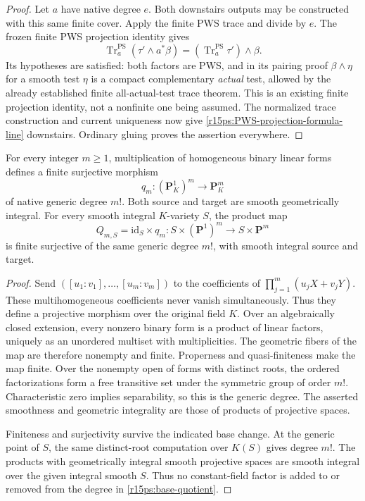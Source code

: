 \begin{proof}
Let $a$ have native degree $e$.  Both downstairs outputs may
be constructed with this same finite cover.  Apply the finite
PWS trace and divide by $e$.  The frozen finite PWS projection
identity gives
\[
 \operatorname{Tr}^{\mathrm{PS}}_a(\tau'\wedge a^*\beta)
                       =(\operatorname{Tr}^{\mathrm{PS}}_a\tau')
                                                    \wedge\beta.
\]
Its hypotheses are satisfied: both factors are PWS, and in
its pairing proof $\beta\wedge\eta$ for a smooth test $\eta$
is a compact complementary \emph{actual} test, allowed by the
already established finite all-actual-test trace theorem.
This is an existing finite projection identity, not a
nonfinite one being assumed.  The normalized trace construction
and current uniqueness now give
\eqref{r15ps:PWS-projection-formula-line} downstairs.  Ordinary
gluing proves the assertion everywhere.
\end{proof}

\begin{lemma}
\label{r15ps:symmetric-quotient}
For every integer $m\geq1$, multiplication of homogeneous binary
linear forms defines a finite surjective morphism
\[
 q_m:(\mathbf P^1_K)^m\longrightarrow\mathbf P^m_K
\tag{PS15.1}\label{r15ps:quotient}
\]
of native generic degree $m!$.  Both source and target are smooth
geometrically integral.  For every smooth integral $K$-variety
$S$, the product map
\[
 Q_{m,S}=\mathrm{id}_S\times q_m:
 S\times(\mathbf P^1)^m\longrightarrow S\times\mathbf P^m
\tag{PS15.2}\label{r15ps:base-quotient}
\]
is finite surjective of the same generic degree $m!$, with
smooth integral source and target.
\end{lemma}

\begin{proof}
Send $([u_1:v_1],\ldots,[u_m:v_m])$ to the coefficients of
$\prod_{j=1}^m(u_jX+v_jY)$.  These multihomogeneous coefficients
never vanish simultaneously.  Thus they define a projective
morphism over the original field $K$.
Over an algebraically closed extension, every nonzero binary
form is a product of linear factors, uniquely as an unordered
multiset with multiplicities.  The geometric fibers of the map
are therefore nonempty and finite.  Properness and
quasi-finiteness make the map finite.  Over the nonempty open
of forms with distinct roots, the ordered factorizations form
a free transitive set under the symmetric group of order $m!$.
Characteristic zero implies separability, so this is the
generic degree.  The asserted smoothness and geometric
integrality are those of products of projective spaces.

Finiteness and surjectivity survive the indicated base change.
At the generic point of $S$, the same distinct-root computation
over $K(S)$ gives degree $m!$.  The products with geometrically
integral smooth projective spaces are smooth integral over
the given integral smooth $S$.  Thus no constant-field factor
is added to or removed from the degree in
\eqref{r15ps:base-quotient}.
\end{proof}

